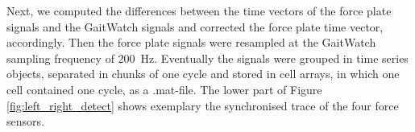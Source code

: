   Next, we computed the differences between the time vectors of the force plate signals and the GaitWatch signals and corrected the force plate time vector, accordingly. Then the force plate signals were resampled at the GaitWatch sampling frequency of \mbox{200 Hz}. Eventually the signals were grouped in time series objects, separated in chunks of one cycle and stored in cell arrays, in which one cell contained one cycle, as a .mat-file. The lower part of Figure \ref{fig:left_right_detect} shows exemplary the synchronised trace of the four force sensors.
 

